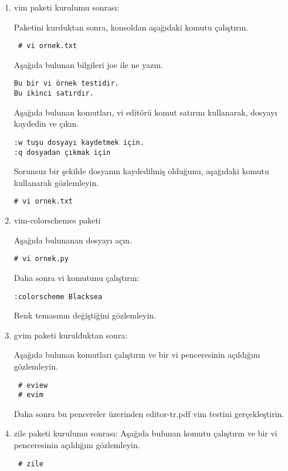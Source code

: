 \documentclass[a4paper,10pt]{article}
\begin{document}
\begin{enumerate}

\item vim paketi kurulumu sonrası:

Paketini kurduktan sonra, konsoldan aşağıdaki komutu çalıştırın.

\begin{verbatim}
 # vi ornek.txt
\end{verbatim}

Aşağıda bulunan bilgileri joe ile ne yazın.
\begin{verbatim}
Bu bir vi örnek testidir.
Bu ikinci satırdır.
\end{verbatim}

Aşağıda bulunan komutları, vi editörü komut satırını kullanarak, dosyayı kaydedin ve çıkın.
\begin{verbatim}
:w tuşu dosyayı kaydetmek için.
:q dosyadan çıkmak için
\end{verbatim}

Sorunsuz bir şekilde dosyanın kaydedilmiş olduğunu, aşağıdaki komutu kullanarak gözlemleyin.
\begin{verbatim}
# vi ornek.txt 
\end{verbatim}

\item vim-colorschemes paketi

Aşağıda bulunanan dosyayı açın.
\begin{verbatim}
# vi ornek.py
\end{verbatim}

Daha sonra vi komutunu çalıştırın:
\begin{verbatim}
:colorscheme Blacksea
\end{verbatim}

Renk temasının değiştiğini gözlemleyin.

\item gvim paketi kurulduktan sonra:

Aşağıda bulunan komutları çalıştırın ve bir vi penceresinin açıldığını gözlemleyin.
\begin{verbatim}
 # eview
 # evim
\end{verbatim}

Daha sonra bu pencereler üzerinden editor-tr.pdf vim testini gerçekleştirin.

\item zile paketi kurulumu sonrası:
Aşağıda bulunan komutu çalıştırın ve bir vi penceresinin açıldığını gözlemleyin.
\begin{verbatim}
 # zile
\end{verbatim}


\end{enumerate}
\end{document}
